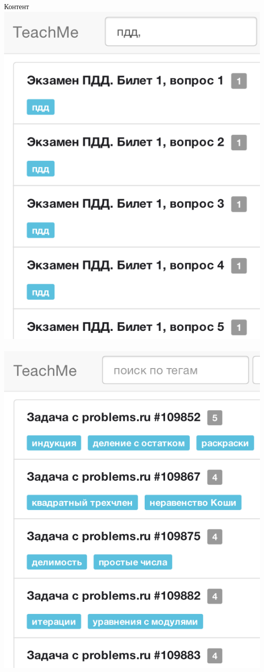 \documentclass[fullscreen, unicode, bookmarks = false]{beamer}
\begin{document}
    \begin{frame}{Контент}
        \includegraphics[scale=0.22]{pdd.png}~~~~~~
	    \includegraphics[scale=0.21]{problems.png}
		~\\~\\	    
	    

\end{frame}
\end{document}
